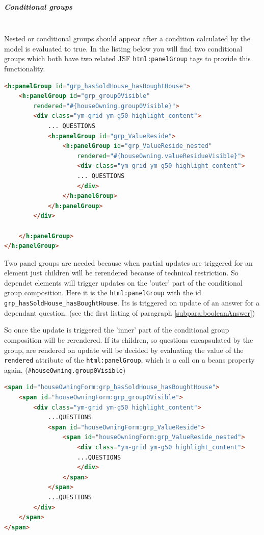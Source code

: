 \subparagraph{Conditional groups}
$\;$ \\Nested or conditional groups should appear after a condition calculated
by the model is evaluated to true. In the listing below you will find two
conditional groups which both have two related JSF \texttt{html:panelGroup}
tags to provide this functionality.

\begin{lstlisting}[language=HTML]
<h:panelGroup id="grp_hasSoldHouse_hasBoughtHouse">
	<h:panelGroup id="grp_group0Visible"
		rendered="#{houseOwning.group0Visible}">
		<div class="ym-grid ym-g50 highlight_content">
			... QUESTIONS
			<h:panelGroup id="grp_ValueReside">
				<h:panelGroup id="grp_ValueReside_nested"
					rendered="#{houseOwning.valueResidueVisible}">
					<div class="ym-grid ym-g50 highlight_content">
					... QUESTIONS
					</div>
				</h:panelGroup>
			</h:panelGroup>		
		</div>
		
	</h:panelGroup>
</h:panelGroup>
\end{lstlisting}

Two panel groups are needed because when partial updates are triggered for an
element just children will be rerendered because of technical restriction. So
dependet elements will trigger updates on the 'outer' part of the conditional
group composition. Here it is the \texttt{html:panelGroup} with the id
\texttt{grp\_hasSoldHouse\_hasBoughtHouse}. Its is triggered on update of an
answer for a dependant question. (see the first listing of paragraph
\ref{subpara:booleanAnswer})

So once the update is triggered the 'inner' part of the conditional group
composition will be rerendered. If its children, so questions encapsulated by
the group, are rendered on update will be decided by evaluating the value
of the \texttt{rendered} attribute of the \texttt{html:panelGroup}, which is a
call on a beans property again. (\texttt{\#{houseOwning.group0Visible}})

\begin{lstlisting}[language=HTML]
<span id="houseOwningForm:grp_hasSoldHouse_hasBoughtHouse"> 
	<span id="houseOwningForm:grp_group0Visible">
		<div class="ym-grid ym-g50 highlight_content">
			...QUESTIONS
			<span id="houseOwningForm:grp_ValueReside"> 
				<span id="houseOwningForm:grp_ValueReside_nested">
					<div class="ym-grid ym-g50 highlight_content">
					...QUESTIONS
					</div>
				</span>
			</span>
			...QUESTIONS
		</div>
	</span>
</span>
\end{lstlisting}

